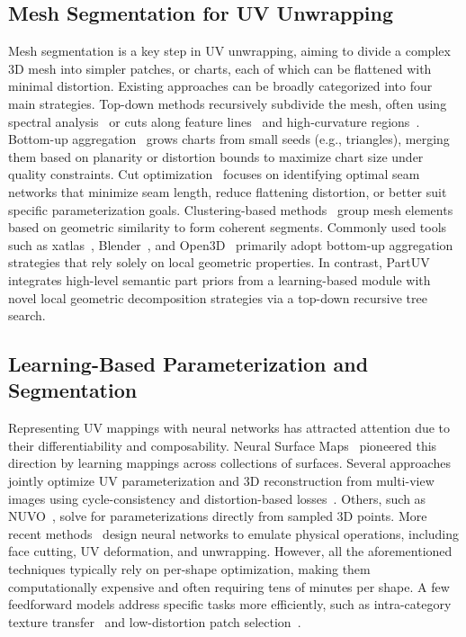 \subsection{Mesh Segmentation for UV Unwrapping}
Mesh segmentation is a key step in UV unwrapping, aiming to divide a complex 3D mesh into simpler patches, or charts, each of which can be flattened with minimal distortion. Existing approaches can be broadly categorized into four main strategies. Top-down methods recursively subdivide the mesh, often using spectral analysis~\cite{liu2007mesh,pothen1990partitioning,Liu2007MeshSegmentation} or cuts along feature lines~\cite{zhang2005feature} and high-curvature regions~\cite{lavoue2005new}. Bottom-up aggregation~\cite{sorkine2002bounded,lscm,kalvin1996superfaces,julius2005d, pulla2001improved, zhou2004iso, yamauchi2005mesh,takahashi2011optimized,bhargava2025mesh} grows charts from small seeds (e.g., triangles), merging them based on planarity or distortion bounds to maximize chart size under quality constraints. Cut optimization~\cite{li2018optcuts, autoCuts,pietroni2009almost,gu2002geometry,Sander2003MultiChartGI, takahashi2011optimized, carr2006rectangular} focuses on identifying optimal seam networks that minimize seam length, reduce flattening distortion, or better suit specific parameterization goals. Clustering-based methods~\cite{katz2003hierarchical,roy2023neural} group mesh elements based on geometric similarity to form coherent segments. Commonly used tools such as xatlas~\cite{xatlas}, Blender~\cite{blender}, and Open3D~\cite{zhou2018open3d} primarily adopt bottom-up aggregation strategies that rely solely on local geometric properties. In contrast, PartUV integrates high-level semantic part priors from a learning-based module with novel local geometric decomposition strategies via a top-down recursive tree search.

\subsection{Learning-Based Parameterization and Segmentation}

Representing UV mappings with neural networks has attracted attention due to their differentiability and composability. Neural Surface Maps~\cite{morreale2021neural} pioneered this direction by learning mappings across collections of surfaces. Several approaches jointly optimize UV parameterization and 3D reconstruction from multi-view images using cycle-consistency and distortion-based losses~\cite{xiang2021neutex,LearninganIsometric}. Others, such as NUVO~\cite{srinivasan2024nuvo}, solve for parameterizations directly from sampled 3D points. More recent methods~\cite{zhang2024flatten,zhao2025flexpara} design neural networks to emulate physical operations, including face cutting, UV deformation, and unwrapping. However, all the aforementioned techniques typically rely on per-shape optimization, making them computationally expensive and often requiring tens of minutes per shape. A few feedforward models address specific tasks more efficiently, such as intra-category texture transfer~\cite{chen2022auv} and low-distortion patch selection~\cite{liu2023wand}.

